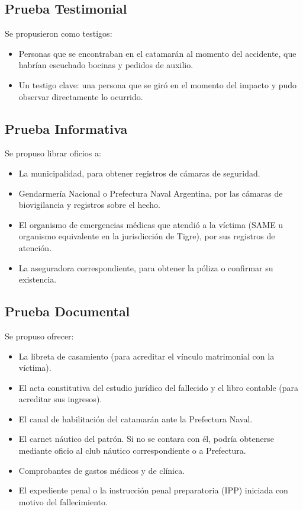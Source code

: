 \documentclass[12pt,oneside]{book}
\begin{document}
\subsection{Prueba Testimonial}

Se propusieron como testigos:
\begin{itemize}
    \item Personas que se encontraban en el catamarán al momento del accidente, que habrían escuchado bocinas y pedidos de auxilio.
    \item Un testigo clave: una persona que se giró en el momento del impacto y pudo observar directamente lo ocurrido.
\end{itemize}

\subsection{Prueba Informativa}

Se propuso librar oficios a:
\begin{itemize}
    \item La municipalidad, para obtener registros de cámaras de seguridad.
    \item Gendarmería Nacional o Prefectura Naval Argentina, por las cámaras de biovigilancia y registros sobre el hecho.
    \item El organismo de emergencias médicas que atendió a la víctima (SAME u organismo equivalente en la jurisdicción de Tigre), por sus registros de atención.
    \item La aseguradora correspondiente, para obtener la póliza o confirmar su existencia.
\end{itemize}

\subsection{Prueba Documental}

Se propuso ofrecer:
\begin{itemize}
    \item La libreta de casamiento (para acreditar el vínculo matrimonial con la víctima).
    \item El acta constitutiva del estudio jurídico del fallecido y el libro contable (para acreditar sus ingresos).
    \item El canal de habilitación del catamarán ante la Prefectura Naval.
    \item El carnet náutico del patrón. Si no se contara con él, podría obtenerse mediante oficio al club náutico correspondiente o a Prefectura.
    \item Comprobantes de gastos médicos y de clínica.
    \item El expediente penal o la instrucción penal preparatoria (IPP) iniciada con motivo del fallecimiento.
\end{itemize}
\end{document}
